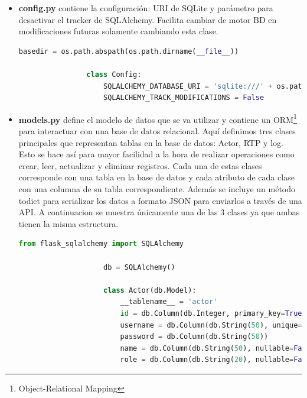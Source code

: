 \begin{itemize}
\begin{lstlisting}[language=Python, style=custom, caption={Configuración y arranque del servidor Flask-SocketIO}]
            if __name__ == '__main__':
                webbrowser.open("http://127.0.0.1:5000/")
                socketio.run(app, debug=True)
        \end{lstlisting}

    \item \textbf{config.py} contiene la configuración: URI de SQLite y parámetro para desactivar el tracker de SQLAlchemy. Facilita cambiar de motor BD en modificaciones futuras solamente cambiando esta clase.
            \begin{lstlisting}[language=Python, style=custom, caption={Configuración SQLAlchemy y SQLite}]
                basedir = os.path.abspath(os.path.dirname(__file__))

                class Config:
                    SQLALCHEMY_DATABASE_URI = 'sqlite:///' + os.path.join(basedir, 'rtp.db')
                    SQLALCHEMY_TRACK_MODIFICATIONS = False

            \end{lstlisting}

    \item \textbf{models.py} define el modelo de datos que se va utilizar y contiene un ORM\footnote{Object-Relational Mapping} para interactuar con una base de datos relacional. Aquí definimos tres clases principales que representan tablas en la base de datos: Actor, RTP y log.
            Esto se hace así para mayor facilidad a la hora de realizar operaciones como crear, leer, actualizar y eliminar registros.
            Cada una de estas clases corresponde con una tabla en la base de datos y cada atributo de cada clase con una columna de su tabla correspondiente. Además se incluye un método todict para serializar los datos a formato JSON para enviarlos a través de una API.
            A continuacion se muestra únicamente una de las 3 clases ya que ambas tienen la misma estructura.

            \begin{lstlisting}[language=Python, style=custom, caption={Modelo ORM + clase Actor}]
                    from flask_sqlalchemy import SQLAlchemy

                    db = SQLAlchemy()

                    class Actor(db.Model):
                        __tablename__ = 'actor'
                        id = db.Column(db.Integer, primary_key=True)
                        username = db.Column(db.String(50), unique=True)
                        password = db.Column(db.String(50))
                        name = db.Column(db.String(50), nullable=False)
                        role = db.Column(db.String(20), nullable=False)


\end{lstlisting}
\end{itemize}
